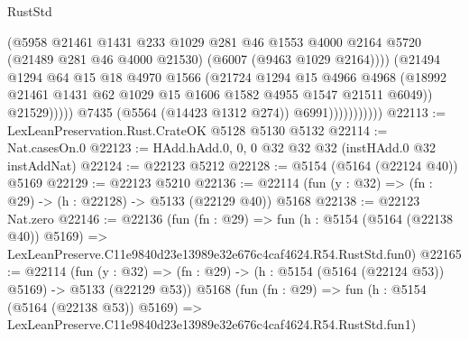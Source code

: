 \begin{lexlean}{RustStd}
\begin{coremodule}
                                    (@5958
                                      @21461
                                      @1431
                                      @233
                                      @1029
                                      @281
                                      @46
                                      @1553
                                      @4000
                                      @2164
                                      @5720
                                      (@21489 @281 @46 @4000 @21530)
                                      (@6007 (@9463 @1029 @2164))))
                                  (@21494
                                    @1294
                                    @64
                                    @15
                                    @18
                                    @4970
                                    @1566
                                    (@21724
                                      @1294
                                      @15
                                      @4966
                                      @4968
                                      (@18992
                                        @21461
                                        @1431
                                        @62
                                        @1029
                                        @15
                                        @1606
                                        @1582
                                        @4955
                                        @1547
                                        @21511
                                        @6049))
                                    @21529)))))
                          @7435
                          (@5564 (@14423 @1312 @274))
                          @6991)))))))))))
@22113 := LexLeanPreservation.Rust.CrateOK @5128 @5130 @5132
@22114 := Nat.casesOn.{0}
@22123 := HAdd.hAdd.{0, 0, 0} @32 @32 @32 (instHAdd.{0} @32 instAddNat)
@22124 := @22123 @5212
@22128 := @5154 (@5164 (@22124 @40)) @5169
@22129 := @22123 @5210
@22136 := @22114 (fun (y : @32) => (fn : @29) -> (h : @22128) -> @5133 (@22129 @40)) @5168
@22138 := @22123 Nat.zero
@22146 := @22136
    (fun (fn : @29) =>
    fun (h : @5154 (@5164 (@22138 @40)) @5169) =>
    LexLeanPreserve.C11e9840d23e13989e32e676c4caf4624.R54.RustStd.fun0)
@22165 := @22114
    (fun (y : @32) => (fn : @29) -> (h : @5154 (@5164 (@22124 @53)) @5169) -> @5133 (@22129 @53))
    @5168
    (fun (fn : @29) =>
    fun (h : @5154 (@5164 (@22138 @53)) @5169) =>
    LexLeanPreserve.C11e9840d23e13989e32e676c4caf4624.R54.RustStd.fun1)

\end{coremodule}
\end{lexlean}
